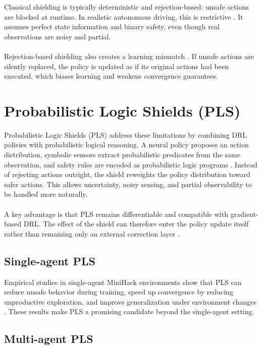 Classical shielding is typically deterministic and rejection-based: unsafe actions are blocked at runtime. In realistic autonomous driving, this is restrictive \cite{yang2023safereinforcementlearningprobabilistic}. It assumes perfect state information and binary safety, even though real observations are noisy and partial.
\\
\\
Rejection-based shielding also creates a learning mismatch \cite{minihackexp}. If unsafe actions are silently replaced, the policy is updated as if its original actions had been executed, which biases learning and weakens convergence guarantees.

\section{Probabilistic Logic Shields (PLS)}

Probabilistic Logic Shields (PLS) \cite{jansen2019safereinforcementlearningprobabilistic} address these limitations by combining DRL policies with probabilistic logical reasoning. A neural policy proposes an action distribution, symbolic sensors extract probabilistic predicates from the same observation, and safety rules are encoded as probabilistic logic programs \cite{yang2023safereinforcementlearningprobabilistic}. Instead of rejecting actions outright, the shield reweights the policy distribution toward safer actions. This allows uncertainty, noisy sensing, and partial observability to be handled more naturally.
\\
\\
A key advantage is that PLS remains differentiable and compatible with gradient-based DRL. The effect of the shield can therefore enter the policy update itself rather than remaining only an external correction layer \cite{minihackexp}.

\subsection{Single-agent PLS}

Empirical studies in single-agent MiniHack environments show that PLS can reduce unsafe behavior during training, speed up convergence by reducing unproductive exploration, and improve generalization under environment changes \cite{minihackexp}. These results make PLS a promising candidate beyond the single-agent setting.

\subsection{Multi-agent PLS}

